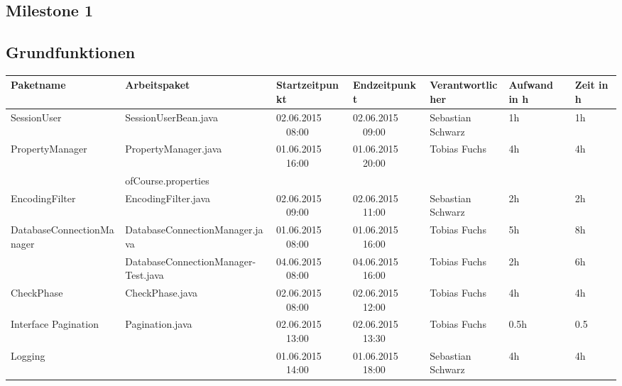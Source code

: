 \begin{landscape}
	\section{Milestone 1}
	
	\subsection{Grundfunktionen}
	\begin{tabular}{|p{5.0cm} |p{6.0 cm}|p{3.2cm}|p{3.2cm}|p{3.3cm}|p{1.7cm}|p{1.5cm}|}
		\hline \textbf{Paketname} & \textbf{Arbeitspaket} & \textbf{Startzeitpunkt} & \textbf{Endzeitpunkt} & \textbf{Verantwortlicher}  & \textbf{Aufwand in h} & \textbf{Zeit in h} \\ 
		\hline  SessionUser          & SessionUserBean.java                     & 02.06.2015 \ \ 08:00         & 02.06.2015 \ \ 09:00        & Sebastian Schwarz     &  1h       &  1h  \\ 
		\hline  PropertyManager      & PropertyManager.java                     & 01.06.2015 \ \ 16:00         & 01.06.2015 \ \ 20:00        & Tobias Fuchs  &  4h       &  4h\\ 
		& ofCourse.properties                      &                            &                              &                                         &         &\\
		\hline  EncodingFilter       & EncodingFilter.java                      & 02.06.2015 \ \ 09:00         & 02.06.2015  \ \  11:00     & Sebastian Schwarz  &  2h       &  2h\\ 
		\hline  DatabaseConnectionManager       &  DatabaseConnectionManager.java & 01.06.2015 \ \ 08:00       & 01.06.2015  \ \  16:00          & Tobias Fuchs &  5h       &  8h \\   
		&  DatabaseConnectionManager- Test.java       & 04.06.2015 \ \ 08:00       & 04.06.2015  \ \  16:00    & Tobias Fuchs &  2h      &   6h\\   
		\hline  CheckPhase           & CheckPhase.java                            & 02.06.2015 \ \ 08:00       & 02.06.2015  \ \  12:00      & Tobias Fuchs &  4h       &  4h \\
		\hline  Interface Pagination & Pagination.java                            & 02.06.2015 \ \ 13:00       & 02.06.2015  \ \  13:30      & Tobias Fuchs  & 0.5h     &  0.5 \\
		\hline  Logging              &                                            & 01.06.2015 \ \ 14:00       & 01.06.2015  \ \  18:00      & Sebastian Schwarz  &  4h       &  4h\\ 

\end{tabular}
\end{landscape}
